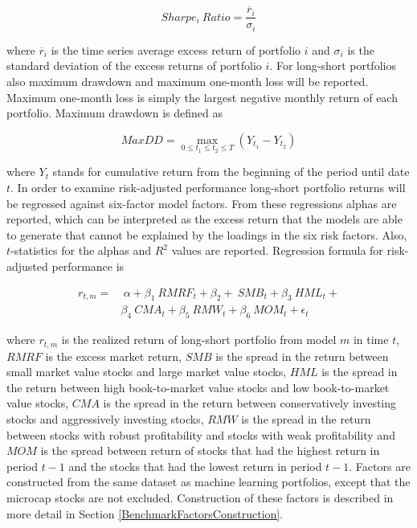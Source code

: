 \documentclass[12pt]{article}
\begin{document}
\begin{equation}
\label{eq:SharpeRatio}
Sharpe_i \ Ratio = \frac{\overline{r}_i}{\sigma_i}
\end{equation}

where $\overline{r}_i$ is the time series average excess return of portfolio $i$ and $\sigma_i$ is the standard deviation of the excess returns of portfolio $i$. For long-short portfolios also maximum drawdown and maximum one-month loss will be reported. Maximum one-month loss is simply the largest negative monthly return of each portfolio. Maximum drawdown is defined as \par

\begin{equation}
\label{eq:maxDD}
MaxDD = \max\limits_{0\leq t_1\leq t_2\leq T} (Y_{t_1} - Y_{t_2})
\end{equation}

where $Y_t$ stands for cumulative return from the beginning of the period until date $t$. In order to examine risk-adjusted performance long-short portfolio returns will be regressed against \citet{FAMA20151} six-factor model factors.\footnotemark {} From these regressions alphas are reported, which can be interpreted as the excess return that the models are able to generate that cannot be explained by the loadings in the six risk factors. Also, $t$-statistics for the alphas and $R^2$ values are reported. Regression formula for risk-adjusted performance is \par

\begin{equation}
\label{eq:FFRegFormula}
\begin{split}
r_{t, m} = 	& \ \alpha+ \beta_{1} \ RMRF_{t} + \beta_{2} + \ SMB_{t} + \beta_{3} \ HML_{t} + \\
		&  \beta_{4} \ CMA_{t} +  \beta_{5} \ RMW_{t} + \beta_{6} \ MOM_{t} + \epsilon_{t}
\end{split}
\end{equation}

where $r_{t, m}$ is the realized return of long-short portfolio from model $m$ in time $t$, $RMRF$ is the excess market return, $SMB$ is the spread in the return between small market value stocks and large market value stocks, $HML$ is the spread in the return between high book-to-market value stocks and low book-to-market value stocks, $CMA$ is the spread in the return between conservatively investing stocks and aggressively investing stocks, $RMW$ is the spread in the return between stocks with robust profitability and stocks with weak profitability and $MOM$ is the spread between return of stocks that had the highest return in period $t-1$ and the stocks that had the lowest return in period $t-1$. \footnotemark {} Factors are constructed from the same dataset as machine learning portfolios, except that the microcap stocks are not excluded. Construction of these factors is described in more detail in Section \ref{BenchmarkFactorsConstruction}. \par
\end{document}

